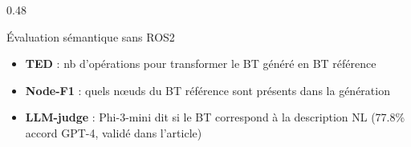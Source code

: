 \documentclass[aspectratio=169]{beamer}
\begin{document}
\begin{frame}
\begin{columns}[T]
\begin{column}{0.48\textwidth}
      \vspace{0.4em}
      \begin{exampleblock}{Évaluation sémantique sans ROS2}
        {\scriptsize\begin{itemize}
          \item \textbf{TED} : nb d'opérations pour transformer le BT généré en BT référence
          \item \textbf{Node-F1} : quels nœuds du BT référence sont présents dans la génération
          \item \textbf{LLM-judge} : Phi-3-mini dit si le BT correspond à la description NL (77.8\% accord GPT-4, validé dans l'article)
        \end{itemize}}
      \end{exampleblock}
    \end{column}
  \end{columns}
\end{frame}

\end{document}
